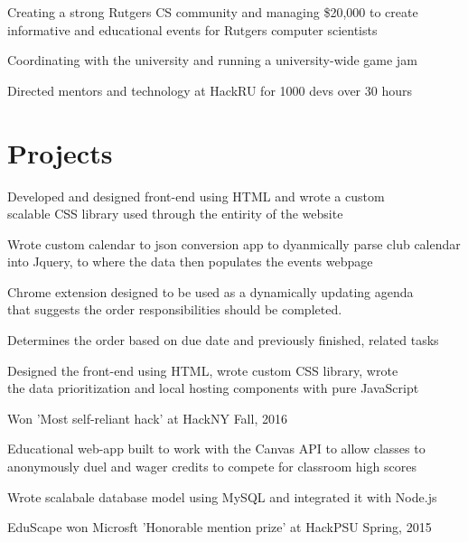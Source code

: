 \documentclass[]{deedy-resume-openfont}
\begin{document}
\begin{minipage}[t]{0.66\textwidth}
\begin{tightemize}
\item Creating a strong Rutgers CS community and managing \$20,000 to create informative and educational events for Rutgers computer scientists
\item Coordinating with the university and running a university-wide  game jam
\item Directed mentors and technology at HackRU for 1000 devs over 30 hours
\end{tightemize}
\sectionsep


\section{Projects}
\begin{tightemize}
\item Developed and designed front-end using HTML and wrote a custom\\ scalable CSS library used through the entirity of the website 
\item Wrote custom calendar to json conversion app to dyanmically parse club calendar into Jquery, to where the data then populates the events webpage 
\end{tightemize}
\sectionsep

\begin{tightemize}
\item Chrome extension designed to be used as a dynamically updating agenda \\that suggests the order responsibilities should be completed. 
\item Determines the order based on due date and previously finished, related tasks
\item Designed the front-end using HTML, wrote custom CSS library, wrote \\the data prioritization and local hosting components with pure JavaScript 
\item Won 'Most self-reliant hack' at HackNY Fall, 2016
\end{tightemize}
\sectionsep

\begin{tightemize}
\item Educational web-app built to work with the Canvas API to allow classes to anonymously duel and wager credits to compete for classroom high scores
\item Wrote scalabale database model using MySQL and integrated it with Node.js 
\item EduScape won Microsft 'Honorable mention prize' at HackPSU Spring, 2015
\end{tightemize}
\sectionsep

\end{minipage} 
\end{document}
